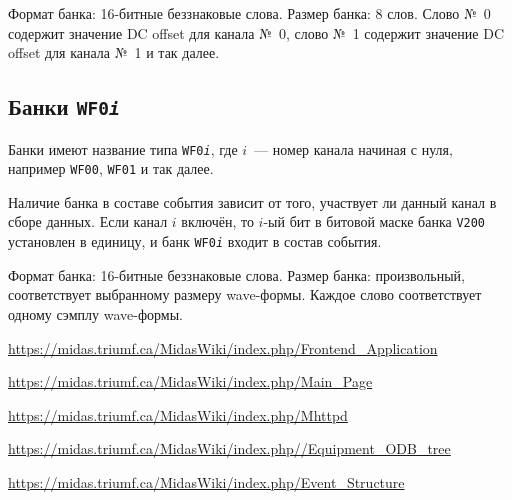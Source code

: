 \documentclass[12pt, a4paper]{article}
\newcommand{\BANK}[1]{{\tt #1}}
\begin{document}
Формат банка: 16-битные беззнаковые слова. Размер банка: 8 слов. Слово №~0 содержит значение DC offset для канала №~0, слово №~1 содержит значение DC offset для канала №~1 и так далее.

\subsection{Банки \BANK{WF0{\it i}}}

Банки имеют название типа \BANK{WF0{\it i}}, где $i$~--- номер канала начиная с нуля, например \BANK{WF00}, \BANK{WF01} и так далее.

Наличие банка в составе события зависит от того, участвует ли данный канал в сборе данных. Если канал $i$ включён, то $i$-ый бит в битовой маске банка \BANK{V200} установлен в единицу, и банк \BANK{WF0{\it i}} входит в состав события.

Формат банка: 16-битные беззнаковые слова. Размер банка: произвольный, соответствует выбранному размеру wave-формы. Каждое слово соответствует одному сэмплу wave-формы.

\begin{thebibliography}{99} 

  {\url{https://midas.triumf.ca/MidasWiki/index.php/Frontend_Application}} 

  {\url{https://midas.triumf.ca/MidasWiki/index.php/Main_Page}} 

  {\url{https://midas.triumf.ca/MidasWiki/index.php/Mhttpd}} 

  {\url{https://midas.triumf.ca/MidasWiki/index.php//Equipment_ODB_tree}} 

  {\url{https://midas.triumf.ca/MidasWiki/index.php/Event_Structure}} 

\end{thebibliography}
\end{document}
